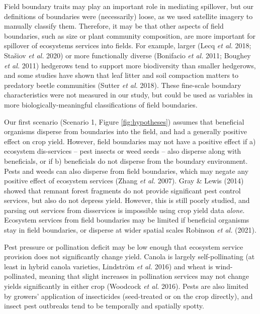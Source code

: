\documentclass[]{elsarticle} %
\begin{document}
Field boundary traits may play an important role in mediating spillover, but our definitions of boundaries were (necessarily) loose, as we used satellite imagery to manually classify them.
Therefore, it may be that other aspects of field boundaries, such as size or plant community composition, are more important for spillover of ecosystems services into fields.
For example, larger (Lecq \emph{et al.} 2018; Stašiov \emph{et al.} 2020) or more functionally diverse (Bonifacio \emph{et al.} 2011; Boughey \emph{et al.} 2011) hedgerows tend to support more biodiversity than smaller hedgerows, and some studies have shown that leaf litter and soil compaction matters to predatory beetle communities (Sutter \emph{et al.} 2018).
These fine-scale boundary characteristics were not measured in our study, but could be used as variables in more biologically-meaningful classifications of field boundaries.

Our first scenario (Scenario 1, Figure \ref{fig:hypotheses}) assumes that beneficial organisms disperse from boundaries into the field, and had a generally positive effect on crop yield.
However, field boundaries may not have a positive effect if a) ecosystem dis-services -- pest insects or weed seeds -- also disperse along with beneficials, or if b) beneficials do not disperse from the boundary environment.
Pests and weeds can also disperse from field boundaries, which may negate any positive effect of ecosystem services (Zhang \emph{et al.} 2007).
Gray \& Lewis (2014) showed that remnant forest fragments do not provide significant pest control services, but also do not depress yield.
However, this is still poorly studied, and parsing out services from disservices is impossible using crop yield data \emph{alone}.
Ecosystem services from field boundaries may be limited if beneficial organisms stay in field boundaries, or disperse at wider spatial scales Robinson \emph{et al.} (2021).

Pest pressure or pollination deficit may be low enough that ecosystem service provision does not significantly change yield.
Canola is largely self-pollinating (at least in hybrid canola varieties, Lindström \emph{et al.} 2016) and wheat is wind-pollinated, meaning that slight increases in pollination services may not change yields significantly in either crop (Woodcock \emph{et al.} 2016).
Pests are also limited by growers' application of insecticides (seed-treated or on the crop directly), and insect pest outbreaks tend to be temporally and spatially spotty.
\end{document}
